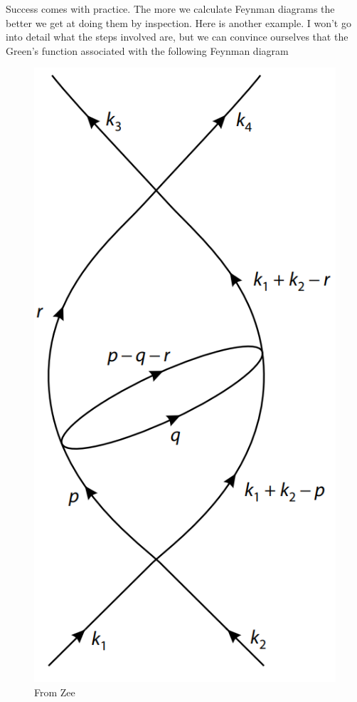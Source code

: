 \documentclass{book}
\theoremstyle{definition}
\begin{document}
Success comes with practice. The more we calculate Feynman diagrams the better we get at doing them by inspection. Here is another example. I won't go into detail what the steps involved are, but we can convince ourselves that the Green's function associated with the following Feynman diagram
\begin{figure}[!htb]
	\centering
	\includegraphics[scale=0.3]{loop-2}
	\caption{From Zee}
\end{figure}
\end{document}
